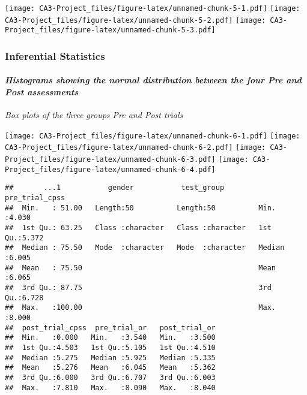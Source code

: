 \documentclass[
]{article}
\begin{document}
\texttt{[image: CA3-Project\_files/figure-latex/unnamed-chunk-5-1.pdf]}
\texttt{[image: CA3-Project\_files/figure-latex/unnamed-chunk-5-2.pdf]}
\texttt{[image: CA3-Project\_files/figure-latex/unnamed-chunk-5-3.pdf]}

\hypertarget{inferential-statistics}{%
\subsubsection{\texorpdfstring{\textbf{Inferential
Statistics}}{Inferential Statistics}}\label{inferential-statistics}}

\hypertarget{histograms-showing-the-normal-distribution-between-the-four-pre-and-post-assessments}{%
\paragraph{\texorpdfstring{\emph{Histograms showing the normal
distribution between the four Pre and Post
assessments}}{Histograms showing the normal distribution between the four Pre and Post assessments}}\label{histograms-showing-the-normal-distribution-between-the-four-pre-and-post-assessments}}

\emph{Box plots of the } \emph{three groups Pre and Post trials}

\texttt{[image: CA3-Project\_files/figure-latex/unnamed-chunk-6-1.pdf]}
\texttt{[image: CA3-Project\_files/figure-latex/unnamed-chunk-6-2.pdf]}
\texttt{[image: CA3-Project\_files/figure-latex/unnamed-chunk-6-3.pdf]}
\texttt{[image: CA3-Project\_files/figure-latex/unnamed-chunk-6-4.pdf]}

\begin{verbatim}
##       ...1           gender           test_group        pre_trial_cpss 
##  Min.   : 51.00   Length:50          Length:50          Min.   :4.030  
##  1st Qu.: 63.25   Class :character   Class :character   1st Qu.:5.372  
##  Median : 75.50   Mode  :character   Mode  :character   Median :6.005  
##  Mean   : 75.50                                         Mean   :6.065  
##  3rd Qu.: 87.75                                         3rd Qu.:6.728  
##  Max.   :100.00                                         Max.   :8.000  
##  post_trial_cpss  pre_trial_or   post_trial_or  
##  Min.   :0.000   Min.   :3.540   Min.   :3.500  
##  1st Qu.:4.503   1st Qu.:5.105   1st Qu.:4.510  
##  Median :5.275   Median :5.925   Median :5.335  
##  Mean   :5.276   Mean   :6.045   Mean   :5.362  
##  3rd Qu.:6.000   3rd Qu.:6.707   3rd Qu.:6.003  
##  Max.   :7.810   Max.   :8.090   Max.   :8.040
\end{verbatim}
\end{document}
